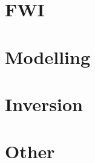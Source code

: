 \documentclass[aspectratio=169, 11pt, t]{beamer}
\newcommand{\secinctex}[1]{}
\begin{document}


\section{FWI}

\secinctex{Tromp_2005_GJI_Adjoint-method}
\secinctex{Tape_2007_GJI_Adjoint-tomography-2D}
\secinctex{Louboutin_2017_EAGE_Gradient-sampling-algorithm}
\secinctex{Komatitsch_2016_GJI_Anelastic-kernels-with-parsimonious-storage}

\section{Modelling}

\section{Inversion}
\secinctex{Sambridge_2001_IP_Neighborhood-algorithm}
\secinctex{Sambridge_2002_RG_Monte-Carlo-inversion}
\secinctex{Minson_2013_GJI_Bayesian-inversion-for-source}

\section{Other}


\end{document}
